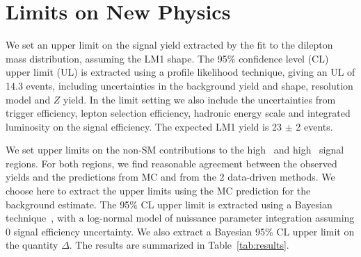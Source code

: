 \section{Limits on New Physics}
\label{sec:limit}

We set an upper limit on the signal yield extracted by the fit to the dilepton mass
distribution, assuming the LM1 shape. The 95\% confidence level (CL) upper limit (UL)
is extracted using a profile likelihood technique, giving an UL of 14.3 events, including
uncertainties in the background yield and shape, resolution model and $Z$ yield.
In the limit setting we also include the uncertainties from trigger efficiency,
lepton selection efficiency, hadronic energy scale and integrated luminosity on the signal efficiency.
The expected LM1 yield is 23 $\pm$ 2 events. 

We set upper limits on the non-SM contributions to the high \MET\ and high \Ht\ signal regions. 
For both regions, we find reasonable agreement between the observed yields and the predictions from MC and from the 2
data-driven methods. We choose here to extract the upper limits using the MC prediction for the
background estimate. The 95\% CL upper limit is extracted using a Bayesian technique~\cite{ref:cl95cms}, 
with a log-normal model of nuissance parameter integration assuming 0 signal efficiency uncertainty. 
We also extract a Bayesian 95\% CL upper limit on the quantity $\Delta$. The results are summarized in 
Table~\ref{tab:results}. 

